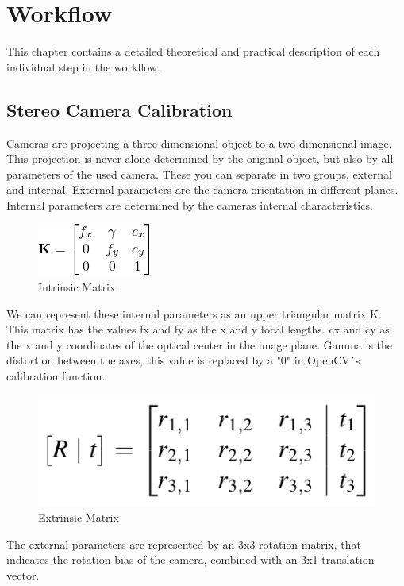 \documentclass[journal,onecolumn]{IEEEtran}
\begin{document}
\section{Workflow}
\noindent
This chapter contains a detailed theoretical and practical description of each individual step in the workflow.
\subsection{Stereo Camera Calibration}
\noindent
Cameras are projecting a three dimensional object to a two dimensional image. This projection is never alone determined by the original object, but also by all parameters of the used camera. These you can separate in two groups, external and internal. External parameters are the camera orientation in different planes. Internal parameters are determined by the cameras internal characteristics.
\begin{figure}[H]
	\centering
	\includegraphics[scale=0.8]{intrinsicMatrix.png}
	\captionsetup{justification=centering}
	\caption{Intrinsic Matrix}
\end{figure}
\noindent
We can represent these internal parameters as an upper triangular matrix K. This matrix has the values fx and fy as the x and y focal lengths. cx and cy as the x and y coordinates of the optical center in the image plane. Gamma is the distortion between the axes, this value is replaced by a "0" in OpenCV´s calibration function.\newline
\begin{figure}[H]
	\centering
	\includegraphics[scale=0.4]{extrinsicMatrix.png}
	\captionsetup{justification=centering}
	\caption{Extrinsic Matrix}
\end{figure}
\noindent
The external parameters are represented by an 3x3 rotation matrix, that indicates the rotation bias of the camera, combined with an 3x1 translation vector.\newline
\end{document}
